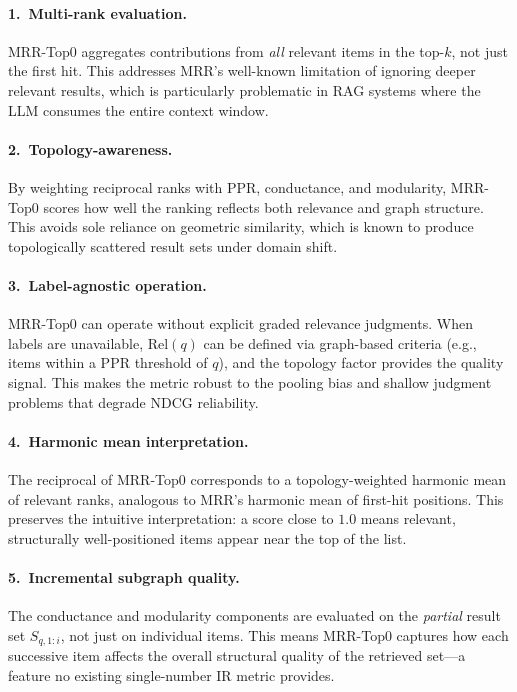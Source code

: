 \documentclass[11pt,a4paper]{article}
\begin{document}
\paragraph{1.\ Multi-rank evaluation.}
MRR-Top0 aggregates contributions from \emph{all} relevant items in the
top-$k$, not just the first hit.  This addresses MRR's well-known
limitation of ignoring deeper relevant results, which is particularly
problematic in RAG systems where the LLM consumes the entire context
window.

\paragraph{2.\ Topology-awareness.}
By weighting reciprocal ranks with PPR, conductance, and modularity,
MRR-Top0 scores how well the ranking reflects both relevance and graph
structure.  This avoids sole reliance on geometric similarity, which is
known to produce topologically scattered result sets under domain shift.

\paragraph{3.\ Label-agnostic operation.}
MRR-Top0 can operate without explicit graded relevance judgments.  When
labels are unavailable, $\mathrm{Rel}(q)$ can be defined via graph-based
criteria (e.g., items within a PPR threshold of $q$), and the topology
factor provides the quality signal.  This makes the metric robust to the
pooling bias and shallow judgment problems that degrade NDCG reliability.

\paragraph{4.\ Harmonic mean interpretation.}
The reciprocal of MRR-Top0 corresponds to a topology-weighted harmonic
mean of relevant ranks, analogous to MRR's harmonic mean of first-hit
positions.  This preserves the intuitive interpretation: a score close to
$1.0$ means relevant, structurally well-positioned items appear near the
top of the list.

\paragraph{5.\ Incremental subgraph quality.}
The conductance and modularity components are evaluated on the
\emph{partial} result set $S_{q,1:i}$, not just on individual items.
This means MRR-Top0 captures how each successive item affects the
overall structural quality of the retrieved set---a feature no existing
single-number IR metric provides.
\end{document}
